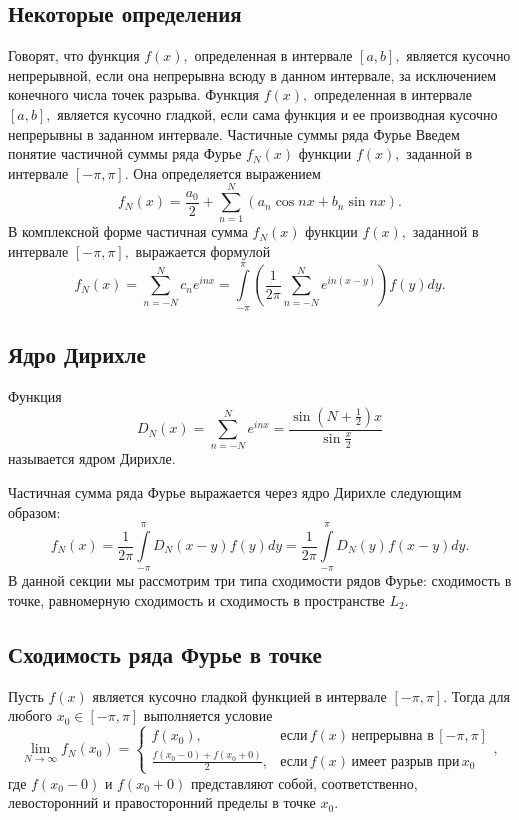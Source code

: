 
\subsection{Некоторые определения}
Говорят, что функция \(f\left( x \right),\) определенная в интервале \(\left[ {a,b} \right],\) является кусочно непрерывной, если она непрерывна всюду в данном интервале, за исключением конечного числа точек разрыва.
Функция \(f\left( x \right),\) определенная в интервале \(\left[ {a,b} \right],\) является кусочно гладкой, если сама функция и ее производная кусочно непрерывны в заданном интервале.
Частичные суммы ряда Фурье
Введем понятие частичной суммы ряда Фурье \({f_N}\left( x \right)\) функции \(f\left( x \right),\) заданной в интервале \(\left[ {-\pi, \pi} \right].\) Она определяется выражением \[{f_N}\left( x \right) = \frac{{{a_0}}}{2} + \sum\limits_{n = 1}^N {\left( {{a_n}\cos nx + {b_n}\sin nx} \right)} .\] В комплексной форме частичная сумма \({f_N}\left( x \right)\) функции \(f\left( x \right),\) заданной в интервале \(\left[ {-\pi, \pi} \right],\) выражается формулой \[ {{f_N}\left( x \right) = \sum\limits_{n = - N}^N {{c_n}{e^{inx}}} } = {\int\limits_{ - \pi }^\pi {\left( {\frac{1}{{2\pi }}\sum\limits_{n = - N}^N {{e^{in\left( {x - y} \right)}}} } \right)f\left( y \right)dy} .} \]
\subsection{Ядро Дирихле}
Функция \[{D_N}\left( x \right) = \sum\limits_{n = - N}^N {{e^{inx}}} = \frac{{\sin \left( {N + \frac{1}{2}} \right)x}}{{\sin \frac{x}{2}}}\] называется ядром Дирихле.

Частичная сумма ряда Фурье выражается через ядро Дирихле следующим образом: \[ {{f_N}\left( x \right) = \frac{1}{{2\pi }}\int\limits_{ - \pi }^\pi {{D_N}\left( {x - y} \right)f\left( y \right)dy} } = {\frac{1}{{2\pi }}\int\limits_{ - \pi }^\pi {{D_N}\left( y \right)f\left( {x - y} \right)dy} .} \] В данной секции мы рассмотрим три типа сходимости рядов Фурье: сходимость в точке, равномерную сходимость и сходимость в пространстве \({L_2}.\)
\subsection{Сходимость ряда Фурье в точке}
Пусть \(f\left( x \right)\) является кусочно гладкой функцией в интервале \(\left[ {-\pi, \pi} \right].\) Тогда для любого \({x_0} \in \left[ { - \pi ,\pi } \right]\) выполняется условие \[ \lim\limits_{N \to \infty } {f_N}\left( {{x_0}} \right) = \begin{cases} f\left( {{x_0}} \right), & \text{если}\,f\left( x \right)\,\text{непрерывна в}\, \left[ { - \pi ,\pi } \right] \\ \frac{{f\left( {{x_0} - 0} \right) + f\left( {{x_0} + 0} \right)}}{2}, & \text{если}\,f\left( x \right)\,\text{имеет разрыв при}\, {{x_0}} \end{cases}, \] где \({f\left( {{x_0} - 0} \right)}\) и \({f\left( {{x_0} + 0} \right)}\) представляют собой, соответственно, левосторонний и правосторонний пределы в точке \({x_0}.\)

